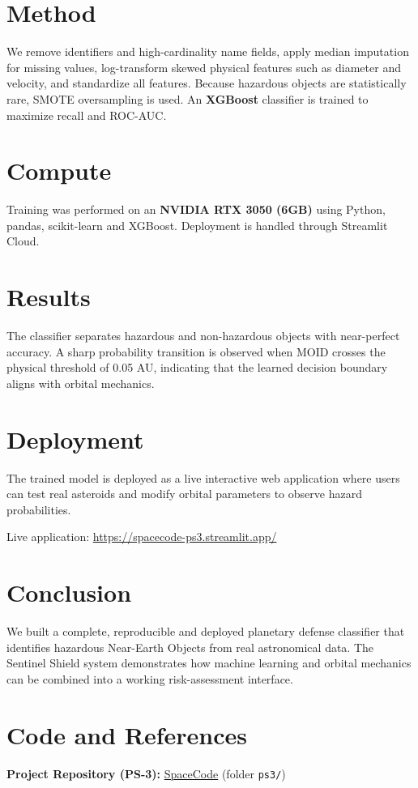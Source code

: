 \documentclass[11pt,a4paper]{article}
\begin{document}
\section{Method}
We remove identifiers and high-cardinality name fields, apply median imputation for missing values,
log-transform skewed physical features such as diameter and velocity, and standardize all features.
Because hazardous objects are statistically rare, SMOTE oversampling is used. An \textbf{XGBoost}
classifier is trained to maximize recall and ROC-AUC.

\section{Compute}
Training was performed on an \textbf{NVIDIA RTX 3050 (6GB)} using Python, pandas, scikit-learn and
XGBoost. Deployment is handled through Streamlit Cloud.

\section{Results}
The classifier separates hazardous and non-hazardous objects with near-perfect accuracy.
A sharp probability transition is observed when MOID crosses the physical threshold of 0.05 AU,
indicating that the learned decision boundary aligns with orbital mechanics.

\section{Deployment}
The trained model is deployed as a live interactive web application where users can test real
asteroids and modify orbital parameters to observe hazard probabilities.

Live application:
\href{https://spacecode-ps3.streamlit.app/}{https://spacecode-ps3.streamlit.app/}

\section{Conclusion}
We built a complete, reproducible and deployed planetary defense classifier that identifies hazardous
Near-Earth Objects from real astronomical data. The Sentinel Shield system demonstrates how machine
learning and orbital mechanics can be combined into a working risk-assessment interface.

\section*{Code and References}
\textbf{Project Repository (PS-3):}
\href{https://github.com/InfinityxR9/SpaceCode}{SpaceCode} (folder \texttt{ps3/})
\end{document}
